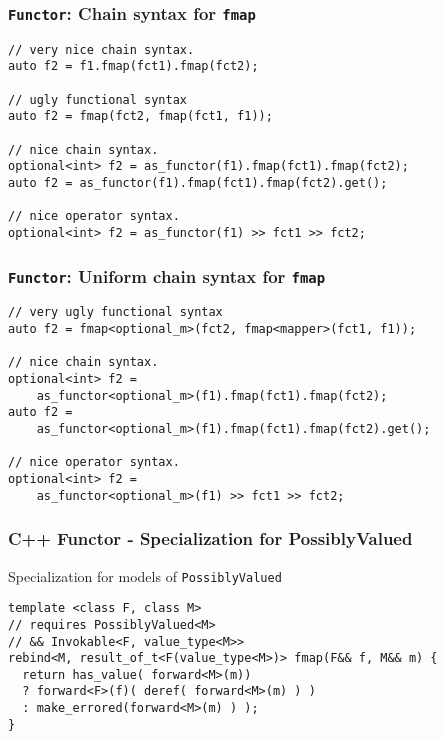 \documentclass[xcolor=dvipsnames]{beamer}
\newcommand{\cpp}[1]{\lstinline{#1}}
\begin{document}
\begin{frame}[fragile]
\frametitle{\cpp{Functor}: Chain syntax for \cpp{fmap}}

\begin{lstlisting}
// very nice chain syntax. 
auto f2 = f1.fmap(fct1).fmap(fct2); 

// ugly functional syntax
auto f2 = fmap(fct2, fmap(fct1, f1));  

// nice chain syntax. 
optional<int> f2 = as_functor(f1).fmap(fct1).fmap(fct2); 
auto f2 = as_functor(f1).fmap(fct1).fmap(fct2).get();

// nice operator syntax.  
optional<int> f2 = as_functor(f1) >> fct1 >> fct2;  
\end{lstlisting}

\end{frame}
\begin{frame}[fragile]
\frametitle{\cpp{Functor}: Uniform chain syntax for \cpp{fmap}}

\begin{lstlisting}
// very ugly functional syntax
auto f2 = fmap<optional_m>(fct2, fmap<mapper>(fct1, f1)); 

// nice chain syntax. 
optional<int> f2 = 
    as_functor<optional_m>(f1).fmap(fct1).fmap(fct2); 
auto f2 = 
    as_functor<optional_m>(f1).fmap(fct1).fmap(fct2).get();

// nice operator syntax.  
optional<int> f2 = 
    as_functor<optional_m>(f1) >> fct1 >> fct2;  
\end{lstlisting}

\end{frame}
\begin{frame}[fragile]
\frametitle{C++ Functor - Specialization for PossiblyValued}
       
Specialization for models of \cpp{PossiblyValued}       

\begin{lstlisting}
template <class F, class M>
// requires PossiblyValued<M> 
// && Invokable<F, value_type<M>>
rebind<M, result_of_t<F(value_type<M>)> fmap(F&& f, M&& m) {
  return has_value( forward<M>(m))
  ? forward<F>(f)( deref( forward<M>(m) ) )
  : make_errored(forward<M>(m) ) );
}
\end{lstlisting}
         
\end{frame}
\end{document}
